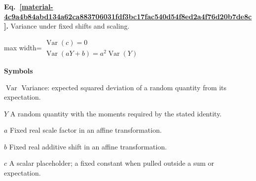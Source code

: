 \documentclass[11pt,a4paper]{article}
\begin{document}
\par\medskip
\noindent\begin{minipage}{\linewidth}
\label{material-4c9a4b84abd134a62ca883706031fdf3bc17fac540d54f8ed2a4f76d20b7de8c}
\noindent\textbf{Eq.~\ref*{material-4c9a4b84abd134a62ca883706031fdf3bc17fac540d54f8ed2a4f76d20b7de8c}.} Variance under fixed shifts and scaling.\par\nopagebreak
\begin{center}\begin{adjustbox}{max width=\linewidth}$\displaystyle \begin{gathered}\operatorname{Var}(c)=0\\\operatorname{Var}(aY+b)=a^2\operatorname{Var}(Y)\end{gathered}$\end{adjustbox}\end{center}

\par\noindent\textbf{Symbols}

\par\noindent\textbf{\(\operatorname{Var}\)} Variance: expected squared deviation of a random quantity from its expectation.

\par\noindent\textbf{\(Y\)} A random quantity with the moments required by the stated identity.

\par\noindent\textbf{\(a\)} Fixed real scale factor in an affine transformation.

\par\noindent\textbf{\(b\)} Fixed real additive shift in an affine transformation.

\par\noindent\textbf{\(c\)} A scalar placeholder; a fixed constant when pulled outside a sum or expectation.

\end{minipage}\par
\medskip
\end{document}
